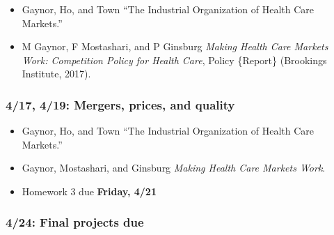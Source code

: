 \documentclass[11pt,]{article}
\providecommand{\tightlist}{%
  \setlength{\itemsep}{0pt}\setlength{\parskip}{0pt}}
\begin{document}
\begin{itemize}
\tightlist
\item
  Gaynor, Ho, and Town {``The {Industrial} {Organization} of {Health}
  {Care} {Markets}.''}
\item
  M Gaynor, F Mostashari, and P Ginsburg \emph{Making Health Care
  Markets Work: {Competition} Policy for Health Care}, Policy \{Report\}
  (Brookings Institute, 2017).
\end{itemize}

\hypertarget{mergers-prices-and-quality}{%
\subsubsection{4/17, 4/19: Mergers, prices, and
quality}\label{mergers-prices-and-quality}}

\begin{itemize}
\tightlist
\item
  Gaynor, Ho, and Town {``The {Industrial} {Organization} of {Health}
  {Care} {Markets}.''}
\item
  Gaynor, Mostashari, and Ginsburg \emph{Making Health Care Markets
  Work}.
\item
  Homework 3 due \textbf{Friday, 4/21}
\end{itemize}

\hypertarget{final-projects-due}{%
\subsubsection{4/24: Final projects due}\label{final-projects-due}}
\end{document}
